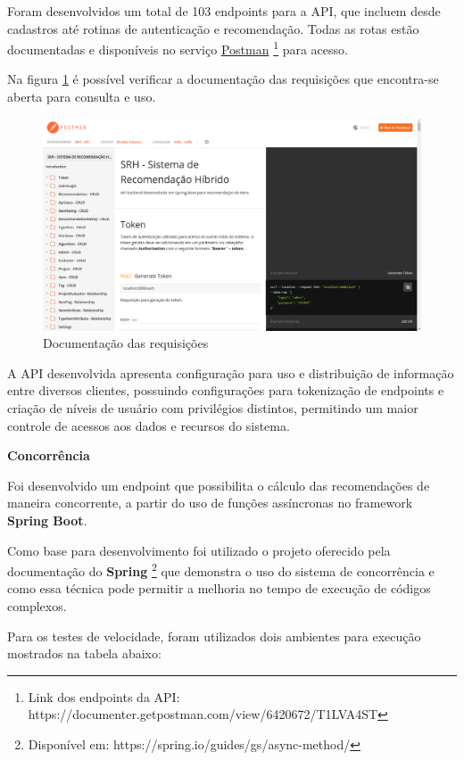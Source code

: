 Foram desenvolvidos um total de 103 endpoints para a API, que incluem desde cadastros até rotinas de autenticação e recomendação. Todas as rotas estão documentadas e disponíveis no serviço \href{https://documenter.getpostman.com/view/6420672/T1LVA4ST}{Postman} \footnote{Link dos endpoints da API: https://documenter.getpostman.com/view/6420672/T1LVA4ST} para acesso.

Na figura \ref{fig:requisicaoPostman} é possível verificar a documentação das requisições que encontra-se aberta para consulta e uso.

\begin{figure}[H]
	\centering
	\includegraphics[width=1\linewidth]{imagens/requisicoesPostman.png}
	\caption[Documentação das requisições]{Documentação das requisições}
    \label{fig:requisicaoPostman}
\end{figure}

A API desenvolvida apresenta configuração para uso e distribuição de informação entre diversos clientes, possuindo configurações para tokenização de endpoints e criação de níveis de usuário com privilégios distintos, permitindo um maior controle de acessos aos dados e recursos do sistema.

\textbf{Concorrência}

Foi desenvolvido um endpoint que possibilita o cálculo das recomendações de maneira concorrente, a partir do uso de funções assíncronas no framework \textbf{Spring Boot}.

Como base para desenvolvimento foi utilizado o projeto oferecido pela documentação do \textbf{Spring} \footnote{Disponível em: https://spring.io/guides/gs/async-method/} que demonstra o uso do sistema de concorrência e como essa técnica pode permitir a melhoria no tempo de execução de códigos complexos.

Para os testes de velocidade, foram utilizados dois ambientes para execução mostrados na tabela abaixo:

